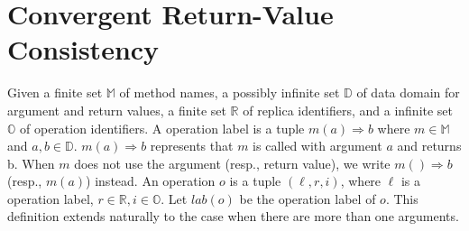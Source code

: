 
\section{Convergent Return-Value Consistency}
\label{sec:specifications and consistencies}












Given a finite set $\mathbb{M}$ of method names, a possibly infinite set $\mathbb{D}$ of data domain for argument and return values, a finite set $\mathbb{R}$ of replica identifiers, and a infinite set $\mathbb{O}$ of operation identifiers. A operation label is a tuple $m(a)\Rightarrow b$ where $m \in \mathbb{M}$ and $a,b \in \mathbb{D}$. $m(a) \Rightarrow b$ represents that $m$ is called with argument $a$ and returns b. When $m$ does not use the argument (resp., return value), we write $m()\Rightarrow b$ (resp., $m(a)$) instead. An operation $o$ is a tuple $(\ell,r,i)$, where $\ell$ is a operation label, $r \in \mathbb{R},i \in \mathbb{O}$. Let $lab(o)$ be the operation label of $o$. This definition extends naturally to the case when there are more than one arguments.

